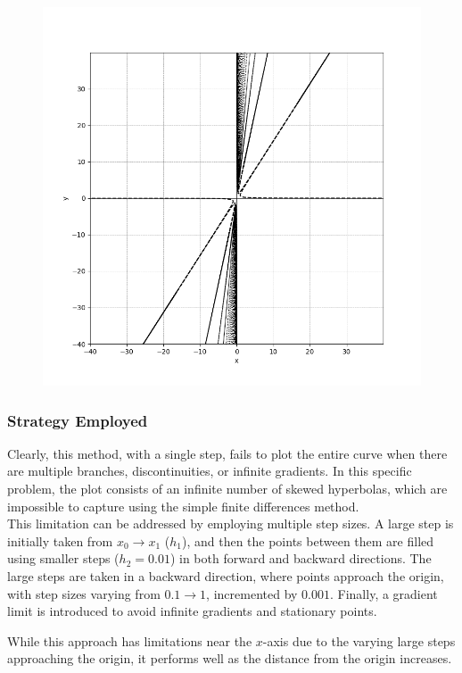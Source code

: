 \documentclass{beamer}
\theoremstyle{remark}
\numberwithin{equation}{section}
\begin{document}
\begin{frame}
	\begin{figure}[h]
		\centering
		\includegraphics[width=0.8\linewidth]{figs/figo.png}
		\caption{}
		\label{graph3}
	\end{figure}
\end{frame}
\begin{frame}
	\frametitle{Strategy Employed}
	Clearly, this method, with a single step, fails to plot the entire curve when there are multiple branches, discontinuities, or infinite gradients. In this specific problem, the plot consists of an infinite number of skewed hyperbolas, which are impossible to capture using the simple finite differences method.  \\
	This limitation can be addressed by employing multiple step sizes. A large step is initially taken from \(x_0 \to x_1\) (\(h_1\)), and then the points between them are filled using smaller steps (\(h_2 = 0.01\)) in both forward and backward directions. The large steps are taken in a backward direction, where points approach the origin, with step sizes varying from \(0.1 \to 1\), incremented by \(0.001\). Finally, a gradient limit is introduced to avoid infinite gradients and stationary points.  
	
	While this approach has limitations near the \(x\)-axis due to the varying large steps approaching the origin, it performs well as the distance from the origin increases.
\end{frame}
\end{document}
